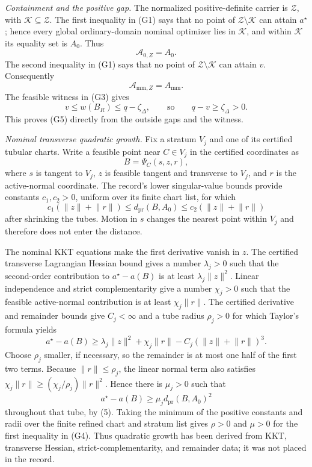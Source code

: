 \emph{Containment and the positive gap.}
The normalized positive-definite carrier is \(\mathcal Z\), with \(\mathcal K\subseteq\mathcal Z\).  The first inequality in (G1) says that no point of \(\mathcal Z\setminus\mathcal K\) can attain \(a^\star\); hence every global ordinary-domain nominal optimizer lies in \(\mathcal K\), and within \(\mathcal K\) its equality set is \(A_0\).  Thus
\[
\mathcal A_{0,Z}=A_0.
\tag{1}
\]
The second inequality in (G1) says that no point of \(\mathcal Z\setminus\mathcal K\) can attain \(v\).  Consequently
\[
\mathcal A_{\mathrm{mm},Z}=A_{\mathrm{mm}}.
\tag{2}
\]
The feasible witness in (G3) gives
\[
v\le w(B_R)\le q-\zeta_\Delta,
\qquad\text{so}\qquad
q-v\ge\zeta_\Delta>0.
\tag{3}
\]
This proves (G5) directly from the outside gaps and the witness.

\emph{Nominal transverse quadratic growth.}
Fix a stratum \(V_j\) and one of its certified tubular charts.  Write a feasible point near \(C\in V_j\) in the certified coordinates as
\[
B=\Psi_C(s,z,r),
\tag{4}
\]
where \(s\) is tangent to \(V_j\), \(z\) is feasible tangent and transverse to \(V_j\), and \(r\) is the active-normal coordinate.  The record's lower singular-value bounds provide constants \(c_1,c_2>0\), uniform over its finite chart list, for which
\[
c_1(\lVert z\rVert+\lVert r\rVert)
\le d_{\mathrm{pr}}(B,A_0)
\le c_2(\lVert z\rVert+\lVert r\rVert)
\tag{5}
\]
after shrinking the tubes.  Motion in \(s\) changes the nearest point within \(V_j\) and therefore does not enter the distance.

The nominal KKT equations make the first derivative vanish in \(z\).  The certified transverse Lagrangian Hessian bound gives a number \(\lambda_j>0\) such that the second-order contribution to \(a^\star-a(B)\) is at least \(\lambda_j\lVert z\rVert^2\).  Linear independence and strict complementarity give a number \(\chi_j>0\) such that the feasible active-normal contribution is at least \(\chi_j\lVert r\rVert\).  The certified derivative and remainder bounds give \(C_j<\infty\) and a tube radius \(\rho_j>0\) for which Taylor's formula yields
\[
a^\star-a(B)
\ge\lambda_j\lVert z\rVert^2+\chi_j\lVert r\rVert
-C_j(\lVert z\rVert+\lVert r\rVert)^3.
\tag{6}
\]
Choose \(\rho_j\) smaller, if necessary, so the remainder is at most one half of the first two terms.  Because \(\lVert r\rVert\le\rho_j\), the linear normal term also satisfies
\(\chi_j\lVert r\rVert\ge(\chi_j/\rho_j)\lVert r\rVert^2\).  Hence there is \(\mu_j>0\) such that
\[
a^\star-a(B)\ge\mu_j d_{\mathrm{pr}}(B,A_0)^2
\tag{7}
\]
throughout that tube, by (5).  Taking the minimum of the positive constants and radii over the finite refined chart and stratum list gives \(\rho>0\) and \(\mu>0\) for the first inequality in (G4).  Thus quadratic growth has been derived from KKT, transverse Hessian, strict-complementarity, and remainder data; it was not placed in the record.

